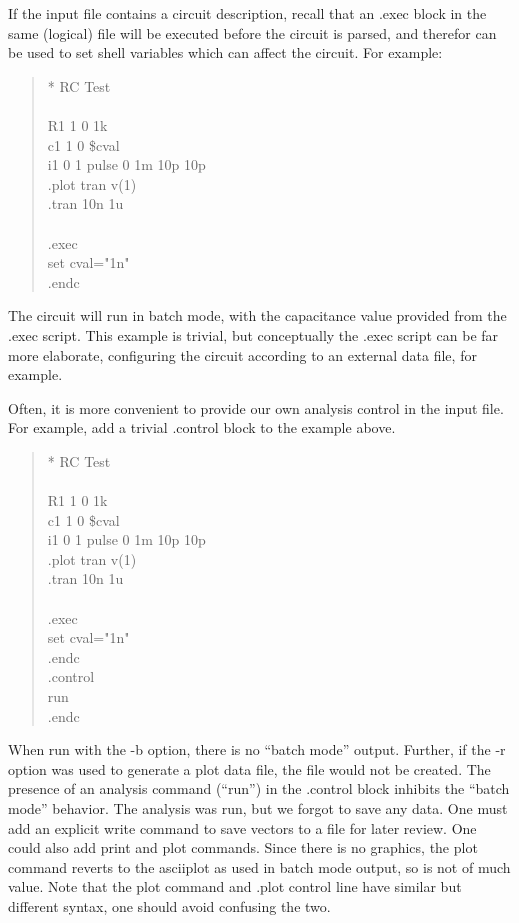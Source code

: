 If the input file contains a circuit description, recall that an {\vt
.exec} block in the same (logical) file will be executed before the
circuit is parsed, and therefor can be used to set shell variables
which can affect the circuit.  For example:

\begin{quote}\vt
* RC Test\\
\\
R1 1 0 1k\\
c1 1 0 \$cval\\
i1 0 1 pulse 0 1m 10p 10p\\
.plot tran v(1)\\
.tran 10n 1u\\
\\
.exec\\
set cval="1n"\\
.endc
\end{quote}

The circuit will run in batch mode, with the capacitance value
provided from the {\vt .exec} script.  This example is trivial, but
conceptually the {\vt .exec} script can be far more elaborate,
configuring the circuit according to an external data file, for
example.

Often, it is more convenient to provide our own analysis control
in the input file.  For example, add a trivial {\vt .control}
block to the example above.

\begin{quote}\vt
* RC Test\\
\\
R1 1 0 1k\\
c1 1 0 \$cval\\
i1 0 1 pulse 0 1m 10p 10p\\
.plot tran v(1)\\
.tran 10n 1u\\
\\
.exec\\
set cval="1n"\\
.endc\\
.control\\
run\\
.endc
\end{quote}

When run with the {\vt -b} option, there is no ``batch mode'' output. 
Further, if the {\vt -r} option was used to generate a plot data file,
the file would not be created.  The presence of an analysis command
(``{\vt run}'') in the {\vt .control} block inhibits the ``batch
mode'' behavior.  The analysis was run, but we forgot to save any
data.  One must add an explicit {\cb write} command to save vectors to
a file for later review.  One could also add {\cb print} and {\cb
plot} commands.  Since there is no graphics, the {\cb plot} command
reverts to the {\cb asciiplot} as used in batch mode output, so is not
of much value.  Note that the {\cb plot} command and {\vt .plot}
control line have similar but different syntax, one should avoid
confusing the two.

